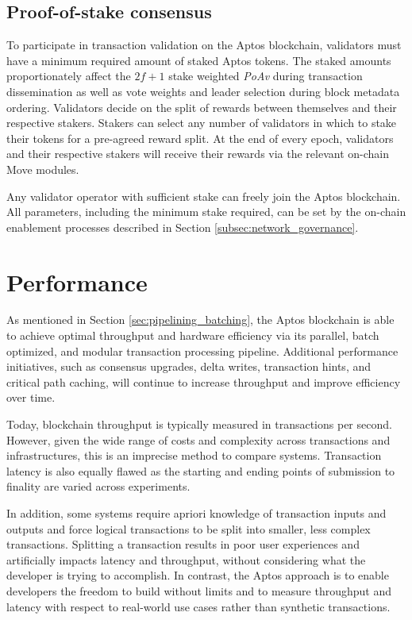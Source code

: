 \documentclass{article}
\begin{document}
\subsection{Proof-of-stake consensus}

To participate in transaction validation on the Aptos blockchain, validators must have a minimum required amount of staked Aptos tokens. The staked amounts proportionately affect the $2f+1$ stake weighted \emph{PoAv} during transaction dissemination as well as vote weights and leader selection during block metadata ordering.  Validators decide on the split of rewards between themselves and their respective stakers. Stakers can select any number of validators in which to stake their tokens for a pre-agreed reward split. At the end of every epoch, validators and their respective stakers will receive their rewards via the relevant on-chain Move modules.

Any validator operator with sufficient stake can freely join the Aptos blockchain. All parameters, including the minimum stake required, can be set by the on-chain enablement processes described in Section \ref{subsec:network_governance}.

\section{Performance}
\label{sec:performance}

As mentioned in Section \ref{sec:pipelining_batching}, the Aptos blockchain is able to achieve optimal throughput and hardware efficiency via its parallel, batch optimized, and modular transaction processing pipeline. Additional performance initiatives, such as consensus upgrades, delta writes, transaction hints, and critical path caching, will continue to increase throughput and improve efficiency over time.

Today, blockchain throughput is typically measured in transactions per second. However, given the wide range of costs and complexity across transactions and infrastructures, this is an imprecise method to compare systems. Transaction latency is also equally flawed as the starting and ending points of submission to finality are varied across experiments.

In addition, some systems require apriori knowledge of transaction inputs and outputs and force logical transactions to be split into smaller, less complex transactions. Splitting a transaction results in poor user experiences and artificially impacts latency and throughput, without considering what the developer is trying to accomplish. In contrast, the Aptos approach is to enable developers the freedom to build without limits and to measure throughput and latency with respect to real-world use cases rather than synthetic transactions.
\end{document}

